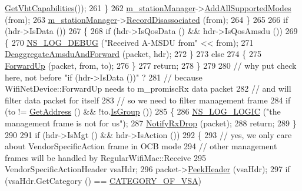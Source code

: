 \begin{DoxyCode}
      \hyperlink{classns3_1_1RegularWifiMac_ade487870f5663694d30a2dd6a7e614e8}{GetVhtCapabilities}());
261         \}
262       \hyperlink{classns3_1_1RegularWifiMac_a76d1a5e27b64bfe36f24a55d1eea2775}{m\_stationManager}->\hyperlink{classns3_1_1WifiRemoteStationManager_a4820bca619f254af7ff3ea2990563dbe}{AddAllSupportedModes} (from);
263       \hyperlink{classns3_1_1RegularWifiMac_a76d1a5e27b64bfe36f24a55d1eea2775}{m\_stationManager}->\hyperlink{classns3_1_1WifiRemoteStationManager_abcb92c63342aed2603c1dfb131e0fe8a}{RecordDisassociated} (from);
264     \}
265 
266   \textcolor{keywordflow}{if} (hdr->IsData ())
267     \{
268       \textcolor{keywordflow}{if} (hdr->IsQosData () && hdr->IsQosAmsdu ())
269         \{
270           \hyperlink{group__logging_ga413f1886406d49f59a6a0a89b77b4d0a}{NS\_LOG\_DEBUG} (\textcolor{stringliteral}{"Received A-MSDU from"} << from);
271           \hyperlink{classns3_1_1RegularWifiMac_a21621ca70e5d272de72d0609eb43cf15}{DeaggregateAmsduAndForward} (packet, hdr);
272         \}
273       \textcolor{keywordflow}{else}
274         \{
275           \hyperlink{classns3_1_1RegularWifiMac_a34df292af97e69fefda8303cdb323d1d}{ForwardUp} (packet, from, to);
276         \}
277       \textcolor{keywordflow}{return};
278     \}
279 
280   \textcolor{comment}{// why put check here, not before "if (hdr->IsData ())" ?}
281   \textcolor{comment}{// because WifiNetDevice::ForwardUp needs to m\_promiscRx data packet}
282   \textcolor{comment}{// and will filter data packet for itself}
283   \textcolor{comment}{// so we need to filter management frame}
284   \textcolor{keywordflow}{if} (to != \hyperlink{classns3_1_1RegularWifiMac_aea719a7d05fbc664c50479fc900777b7}{GetAddress} () && !to.\hyperlink{classns3_1_1Mac48Address_ae191b13b8ecd9d138c2301483ab826e8}{IsGroup} ())
285     \{
286       \hyperlink{group__logging_ga88acd260151caf2db9c0fc84997f45ce}{NS\_LOG\_LOGIC} (\textcolor{stringliteral}{"the management frame is not for us"});
287       \hyperlink{classns3_1_1WifiMac_acc2ef3079b2a6ac4fb3838608e5e1ed4}{NotifyRxDrop} (packet);
288       \textcolor{keywordflow}{return};
289     \}
290 
291   \textcolor{keywordflow}{if} (hdr->IsMgt () && hdr->IsAction ())
292     \{
293       \textcolor{comment}{// yes, we only care about VendorSpecificAction frame in OCB mode}
294       \textcolor{comment}{// other management frames will be handled by RegularWifiMac::Receive}
295       VendorSpecificActionHeader vsaHdr;
296       packet->\hyperlink{classns3_1_1Packet_aadc63487bea70945c418f4c3e9b81964}{PeekHeader} (vsaHdr);
297       \textcolor{keywordflow}{if} (vsaHdr.GetCategory () == \hyperlink{namespacens3_aded86438827ae4ff341e6ecb0a5f38b6}{CATEGORY\_OF\_VSA})

\end{DoxyCode}
